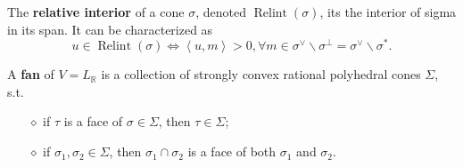 \documentclass[11pt,english]{smfart}
\newtheorem{theorem}{Theorem}
\newtheorem{proposition}{Proposition}[section]
\theoremstyle{definition}
\theoremstyle{remark}
\newcommand{\R}{\mathbb{R}}
\newcommand{\sminus}{\smallsetminus} %
\DeclareMathOperator{\im}{im} %
\newcommand{\myit}{$\diamond$}
\newcommand{\dual}[1]{{#1}^\vee}
\DeclareMathOperator{\relint}{Relint}
\begin{document}
\indent

The \textbf{relative interior} of a cone $\sigma$, denoted $\relint(\sigma)$, its the interior of sigma in its span.
It can be characterized as \[u\in\relint(\sigma)\iff \left<u, m\right> > 0, \forall m\in\dual{\sigma}\sminus\sigma^{\perp} = \dual{\sigma}\sminus\sigma^*.\]

    

A \textbf{fan} of $V = L_\R$ is a collection of strongly convex rational polyhedral cones $\Sigma$, s.t.\begin{enumerate}
    \item [\myit] if $\tau$ is a face of $\sigma\in\Sigma$, then $\tau\in\Sigma$;
    \item [\myit] if $\sigma_1, \sigma_2\in\Sigma$, then $\sigma_1\cap\sigma_2$ is a face of both $\sigma_1$ and $\sigma_2$.
\end{enumerate}
    


\end{document}

